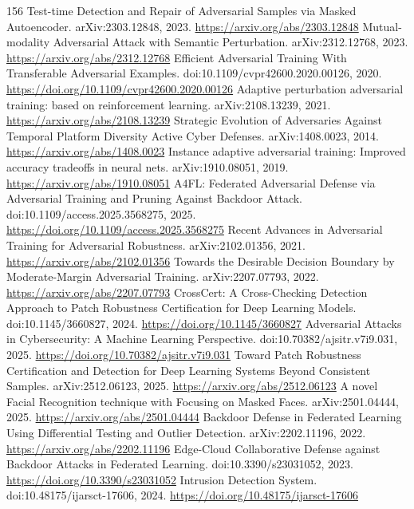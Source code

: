 \documentclass[11pt]{article}
\begin{document}
\begin{thebibliography}{156}
 Test-time Detection and Repair of Adversarial Samples via Masked Autoencoder. arXiv:2303.12848, 2023. \url{https://arxiv.org/abs/2303.12848}
 Mutual-modality Adversarial Attack with Semantic Perturbation. arXiv:2312.12768, 2023. \url{https://arxiv.org/abs/2312.12768}
 Efficient Adversarial Training With Transferable Adversarial Examples. doi:10.1109/cvpr42600.2020.00126, 2020. \url{https://doi.org/10.1109/cvpr42600.2020.00126}
 Adaptive perturbation adversarial training: based on reinforcement learning. arXiv:2108.13239, 2021. \url{https://arxiv.org/abs/2108.13239}
 Strategic Evolution of Adversaries Against Temporal Platform Diversity Active Cyber Defenses. arXiv:1408.0023, 2014. \url{https://arxiv.org/abs/1408.0023}
 Instance adaptive adversarial training: Improved accuracy tradeoffs in neural nets. arXiv:1910.08051, 2019. \url{https://arxiv.org/abs/1910.08051}
 A4FL: Federated Adversarial Defense via Adversarial Training and Pruning Against Backdoor Attack. doi:10.1109/access.2025.3568275, 2025. \url{https://doi.org/10.1109/access.2025.3568275}
 Recent Advances in Adversarial Training for Adversarial Robustness. arXiv:2102.01356, 2021. \url{https://arxiv.org/abs/2102.01356}
 Towards the Desirable Decision Boundary by Moderate-Margin Adversarial Training. arXiv:2207.07793, 2022. \url{https://arxiv.org/abs/2207.07793}
 CrossCert: A Cross-Checking Detection Approach to Patch Robustness Certification for Deep Learning Models. doi:10.1145/3660827, 2024. \url{https://doi.org/10.1145/3660827}
 Adversarial Attacks in Cybersecurity: A Machine Learning Perspective. doi:10.70382/ajsitr.v7i9.031, 2025. \url{https://doi.org/10.70382/ajsitr.v7i9.031}
 Toward Patch Robustness Certification and Detection for Deep Learning Systems Beyond Consistent Samples. arXiv:2512.06123, 2025. \url{https://arxiv.org/abs/2512.06123}
 A novel Facial Recognition technique with Focusing on Masked Faces. arXiv:2501.04444, 2025. \url{https://arxiv.org/abs/2501.04444}
 Backdoor Defense in Federated Learning Using Differential Testing and Outlier Detection. arXiv:2202.11196, 2022. \url{https://arxiv.org/abs/2202.11196}
 Edge-Cloud Collaborative Defense against Backdoor Attacks in Federated Learning. doi:10.3390/s23031052, 2023. \url{https://doi.org/10.3390/s23031052}
 Intrusion Detection System. doi:10.48175/ijarsct-17606, 2024. \url{https://doi.org/10.48175/ijarsct-17606}

\end{thebibliography}
\end{document}
